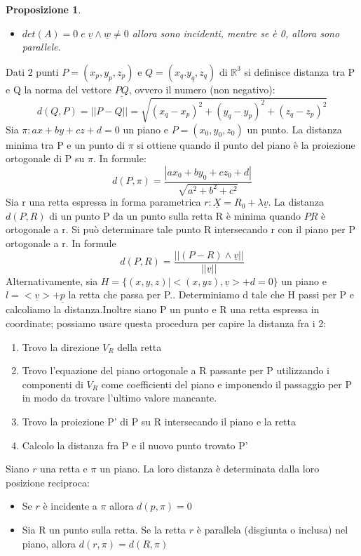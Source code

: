 \documentclass[12pt]{article}
\newenvironment{para}{\begin{adjustwidth}{13mm}{}}{\end{adjustwidth}}
\newtheorem{Proposizione}{Proposizione}[subsection]
\begin{document}
\begin{para}
\begin{Proposizione}
\begin{itemize}
    \item $det(A) = 0 \; e \; \underline{v}\land \underline{w} \neq 0$ allora sono incidenti, mentre se è 0, allora sono parallele.
\end{itemize}
\end{Proposizione}
Dati 2 punti $P = (x_p, y_p, z_p)$ e $Q = (x_q. y_q, z_q)$ di $\mathbb{R}^3$ si definisce distanza tra P e Q la norma del vettore $\underline{PQ}$, ovvero il numero (non negativo): $$d(Q,P) = \bigl||P-Q|\bigr| = \sqrt{(x_q-x_p)^2+(y_q-y_p)^2+(z_q-z_p)^2}$$
Sia $\pi: ax+by+cz+d = 0$ un piano e $P = (x_0, y_0, z_0)$ un punto. La distanza minima tra P e un punto di $\pi$ si ottiene quando il punto del piano è la proiezione ortogonale di P su $\pi$. In formule: $$d(P, \pi) = \frac{|ax_0+by_0+cz_0+d|}{\sqrt{a^2+b^2+c^2}}$$
Sia  r una retta espressa in forma parametrica $r: \underline{X} = R_0 + \lambda \underline{v}$. La distanza $d(P, R)$ di un punto P da un punto sulla retta R è minima quando $\underline{PR}$ è ortogonale a r. Si può determinare tale punto R intersecando r con il piano per P ortogonale a r. In formule $$d(P,R) = \frac{\bigl||(P-R)\land \underline{v}|\bigr|}{\bigl||\underline{v}|\bigr|}$$
Alternativamente, sia $H = \{(x,y,z)| <(x,yz), \underline{v} > + d = 0 \}$ un piano e \newline $l = <\underline{v}> + \underline{p}$ la retta che passa per P.. Determiniamo d tale che H passi per P e calcoliamo la distanza.\newline Inoltre siano P un punto e R una retta espressa in coordinate; possiamo usare questa procedura per capire la distanza fra i 2: \begin{enumerate}
    \item Trovo la direzione $V_R$ della retta 
    \item Trovo l'equazione del piano ortogonale a R passante per P utilizzando i componenti di $V_R$ come coefficienti del piano e imponendo il passaggio per P in modo da trovare l'ultimo valore mancante.
    \item Trovo la proiezione P' di P su R intersecando il piano e la retta
    \item Calcolo la distanza fra P e il nuovo punto trovato P'
\end{enumerate}
Siano $r$ una retta e $\pi$ un piano. La loro distanza è determinata dalla loro posizione reciproca:
\begin{itemize}
    \item Se $r$ è incidente a $\pi$ allora $d(p, \pi) = 0$
    \item Sia R un punto sulla retta. Se la retta $r$ è parallela (disgiunta o inclusa) nel piano, allora $d(r, \pi) = d(R, \pi)$

\end{itemize}
\end{para}
\end{document}
